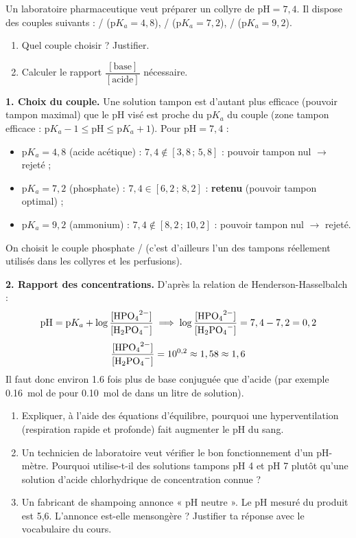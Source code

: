 \documentclass[11pt]{article}
\begin{document}
\begin{exoresolu}
Un laboratoire pharmaceutique veut préparer un collyre de $\mathrm{pH} = 7,4$. Il dispose des couples suivants : / ($\mathrm{p}K_a = 4,8$), / ($\mathrm{p}K_a = 7,2$), / ($\mathrm{p}K_a = 9,2$).
\begin{enumerate}
\item Quel couple choisir ? Justifier.
\item Calculer le rapport $\dfrac{[\text{base}]}{[\text{acide}]}$ nécessaire.
\end{enumerate}
\tcblower
\textbf{1. Choix du couple.} Une solution tampon est d'autant plus efficace (pouvoir tampon maximal) que le pH visé est proche du $\mathrm{p}K_a$ du couple (zone tampon efficace : $\mathrm{p}K_a - 1 \leqslant \mathrm{pH} \leqslant \mathrm{p}K_a + 1$). Pour $\mathrm{pH} = 7,4$ :
\begin{itemize}
\item $\mathrm{p}K_a = 4,8$ (acide acétique) : $7,4 \notin [3,8\,;\,5,8]$ : pouvoir tampon nul $\rightarrow$ rejeté ;
\item $\mathrm{p}K_a = 7,2$ (phosphate) : $7,4 \in [6,2\,;\,8,2]$ : \textbf{retenu} (pouvoir tampon optimal) ;
\item $\mathrm{p}K_a = 9,2$ (ammonium) : $7,4 \notin [8,2\,;\,10,2]$ : pouvoir tampon nul $\rightarrow$ rejeté.
\end{itemize}
On choisit le couple phosphate / (c'est d'ailleurs l'un des tampons réellement utilisés dans les collyres et les perfusions).

\textbf{2. Rapport des concentrations.} D'après la relation de Henderson-Hasselbalch :
\[ \mathrm{pH} = \mathrm{p}K_a + \log\frac{[\ce{HPO4^2-}]}{[\ce{H2PO4-}]} \implies \log\frac{[\ce{HPO4^2-}]}{[\ce{H2PO4-}]} = 7,4 - 7,2 = 0,2 \]
\[ \frac{[\ce{HPO4^2-}]}{[\ce{H2PO4-}]} = 10^{0,2} \approx 1,58 \approx 1,6 \]
Il faut donc environ \num{1,6} fois plus de base conjuguée  que d'acide  (par exemple \SI{0,16}{mol} de  pour \SI{0,10}{mol} de  dans un litre de solution).
\end{exoresolu}

\begin{exercice}
\begin{enumerate}
\item Expliquer, à l'aide des équations d'équilibre, pourquoi une hyperventilation (respiration rapide et profonde) fait augmenter le pH du sang.
\item Un technicien de laboratoire veut vérifier le bon fonctionnement d'un pH-mètre. Pourquoi utilise-t-il des solutions tampons pH 4 et pH 7 plutôt qu'une solution d'acide chlorhydrique de concentration connue ?
\item Un fabricant de shampoing annonce « pH neutre ». Le pH mesuré du produit est 5,6. L'annonce est-elle mensongère ? Justifier ta réponse avec le vocabulaire du cours.
\end{enumerate}
\end{exercice}
\end{document}
